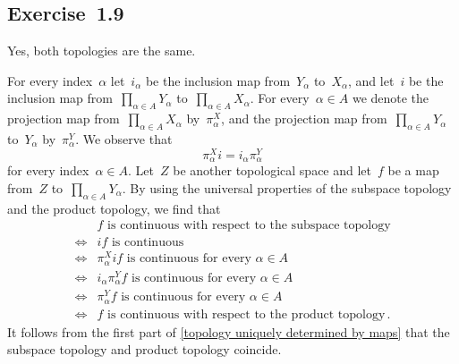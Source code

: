 \subsection{Exercise~1.9}

Yes, both topologies are the same.

For every index~$α$ let~$i_α$ be the inclusion map from~$Y_α$ to~$X_α$, and let~$i$ be the inclusion map from~$∏_{α ∈ A} Y_α$ to~$∏_{α ∈ A} X_α$.
For every~$α ∈ A$ we denote the projection map from~$∏_{α ∈ A} X_α$ by~$π^X_α$, and the projection map from~$∏_{α ∈ A} Y_α$ to~$Y_α$ by~$π^Y_α$.
We observe that
\[
	π^X_α i = i_α π^Y_α
\]
for every index~$α ∈ A$.
Let~$Z$ be another topological space and let~$f$ be a map from~$Z$ to~$∏_{α ∈ A} Y_α$.
By using the universal properties of the subspace topology and the product topology, we find that
\begin{align*}
	{}&
	\text{$f$ is continuous with respect to the subspace topology}
	\\
	\iff{}&
	\text{$i f$ is continuous}
	\\
	\iff{}&
	\text{$π^X_α i f$ is continuous for every~$α ∈ A$}
	\\
	\iff{}&
	\text{$i_α π^Y_α f$ is continuous for every~$α ∈ A$}
	\\
	\iff{}&
	\text{$π^Y_α f$ is continuous for every~$α ∈ A$}
	\\
	\iff{}&
	\text{$f$ is continuous with respect to the product topology} \,.
\end{align*}
It follows from the first part of \cref{topology uniquely determined by maps} that the subspace topology and product topology coincide.
